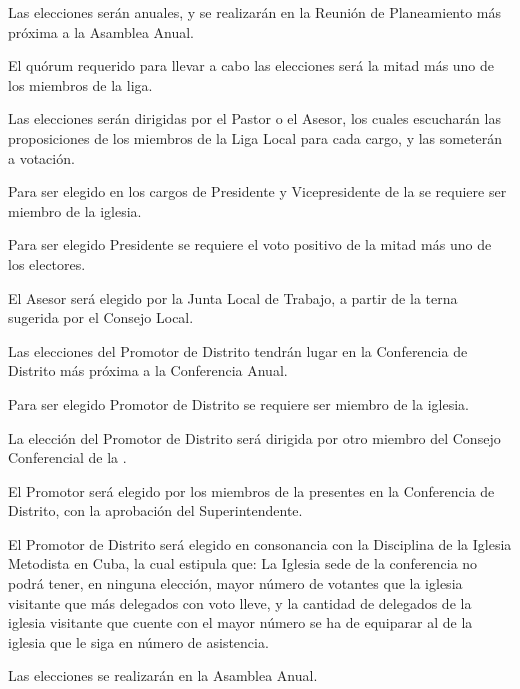 \label{elecciones}


\article
Las elecciones serán anuales, y se realizarán en la Reunión de Planeamiento más próxima a la Asamblea Anual.

\article
El quórum requerido para llevar a cabo las elecciones será la mitad más uno de los miembros de la liga.

\article
Las elecciones serán dirigidas por el Pastor o el Asesor, los cuales escucharán las proposiciones de los miembros de la Liga Local para cada cargo, y las someterán a votación.

\article
Para ser elegido en los cargos de Presidente y Vicepresidente de la \LMJ{} se requiere ser miembro de la iglesia.

\article
Para ser elegido Presidente se requiere el voto positivo de la mitad más uno de los electores.

\article
El Asesor será elegido por la Junta Local de Trabajo, a partir de la terna sugerida por el Consejo Local.


\article
Las elecciones del Promotor de Distrito tendrán lugar en la Conferencia de Distrito más próxima a la Conferencia Anual.

\article
\label{requisitos-promotor}
Para ser elegido Promotor de Distrito se requiere ser miembro de la iglesia.

\article
\label{direccion-eleccion-promotor}
La elección del Promotor de Distrito será dirigida por otro miembro del Consejo Conferencial de la \LMJ{}.

\article
El Promotor será elegido por los miembros de la \LMJ{} presentes en la Conferencia de Distrito, con la aprobación del Superintendente.

\article
El Promotor de Distrito será elegido en consonancia con la Disciplina de la Iglesia Metodista en Cuba, la cual estipula que: La Iglesia sede de la conferencia no podrá tener, en ninguna elección, mayor número de votantes que la iglesia visitante que más delegados con voto lleve, y la cantidad de delegados de la iglesia visitante que cuente con el mayor número se ha de equiparar al de la iglesia que le siga en número de asistencia.


\article
Las elecciones se realizarán en la Asamblea Anual.


